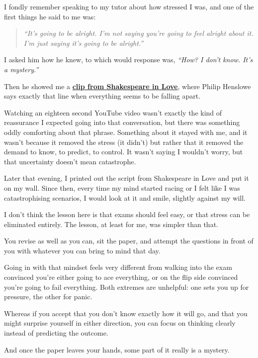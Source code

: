I fondly remember speaking to my tutor about how stressed I was, and one of the first things he said to me was: 

\begin{quote}
    \textit{“It’s going to be alright. I’m not saying you’re going to feel alright about it. I’m just saying it’s going to be alright.”}
\end{quote}

I asked him how he knew, to which would response was, \textit{}\textit{“How? I don’t know. It’s a mystery.”}

Then he showed me a \textbf{\href{https://youtu.be/-hxTrm34oRI?si=08GXYMDkDqyzMvLp}{clip from Shakespeare in Love}}, where Philip Henslowe says exactly that line when everything seems to be falling apart.

Watching an eighteen second YouTube video wasn’t exactly the kind of reassurance I expected going into that conversation, but there was something oddly comforting about that phrase. Something about it stayed with me, and it wasn’t because it removed the stress (it didn’t) but rather that it removed the demand to know, to predict, to control. It wasn’t saying I wouldn’t worry, but that uncertainty doesn’t mean catastrophe.

Later that evening, I printed out the script from Shakespeare in Love and put it on my wall. Since then, every time my mind started racing or I felt like I was catastrophising scenarios, I would look at it and smile, slightly against my will.

I don’t think the lesson here is that exams should feel easy, or that stress can be eliminated entirely. The lesson, at least for me, was simpler than that.

You revise as well as you can, sit the paper, and attempt the questions in front of you with whatever you can bring to mind that day.

Going in with that mindset feels very different from walking into the exam convinced you’re either going to ace everything, or on the flip side convinced you’re going to fail everything. Both extremes are unhelpful: one sets you up for pressure, the other for panic. 

Whereas if you accept that you don’t know exactly how it will go, and that you might surprise yourself in either direction, you can focus on thinking clearly instead of predicting the outcome.

And once the paper leaves your hands, some part of it really is a mystery.



